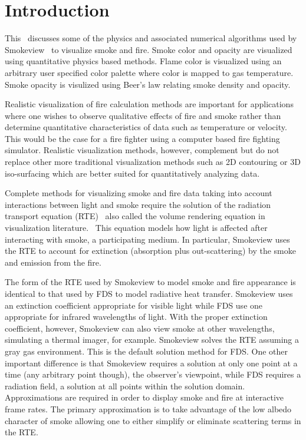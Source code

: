 


\section{Introduction}
This \paper\ discusses some of the physics and associated numerical
algorithms used by Smokeview~\cite{Smokeview_Users_Guide} to
visualize smoke and fire.  Smoke color and opacity are visualized
using quantitative physics based methods.  Flame color
is visualized using an arbitrary user specified color palette
where color is mapped to gas temperature.
Smoke opacity is visulized using Beer's law relating smoke density and opacity.

Realistic visualization of fire calculation methods are important
for applications where one wishes to observe qualitative effects
of fire and smoke rather than determine quantitative
characteristics of data such as temperature or velocity.  This
would be the case for a fire fighter using a computer based fire
fighting simulator. Realistic visualization methods, however,
complement but do not replace other more traditional visualization
methods such as 2D contouring or 3D iso-surfacing which are better
suited for quantitatively analyzing data.

Complete methods for visualizing smoke and fire data taking into
account interactions between light and smoke require the solution
of the radiation transport equation (RTE)~\cite{Siegel:2001} also
called the volume rendering equation in visualization
literature.~\cite{levoy:1988} This equation models how light is
affected after interacting with smoke, a participating medium. In
particular, Smokeview uses the RTE to account for extinction
(absorption plus out-scattering) by the smoke and emission from
the fire.

The form of the RTE used by Smokeview to model smoke and fire
appearance is identical to that used by FDS to model radiative
heat transfer. Smokeview uses an extinction coefficient
appropriate for visible light while FDS use one appropriate for
infrared wavelengths of light.  With the proper extinction
coefficient, however, Smokeview can also view smoke at other
wavelengths, simulating a thermal imager, for example. Smokeview
solves the RTE assuming a gray gas environment. This is the
default solution method for FDS. One other important difference is
that Smokeview requires a solution at only one point at a time
(any arbitrary point though), the observer's viewpoint, while FDS
requires a radiation field, a solution at all points within the
solution domain.
Approximations are
required in order to display smoke and fire at interactive frame
rates.  The primary approximation is to take advantage of the low
albedo character of smoke allowing one to either simplify or
eliminate scattering terms in the RTE.

